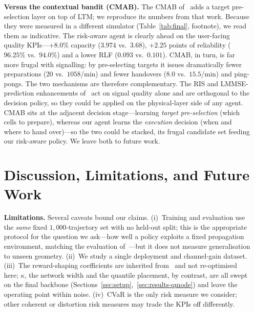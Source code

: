 \documentclass[conference]{IEEEtran}
\begin{document}
\textbf{Versus the contextual bandit (CMAB).} The CMAB of~\cite{cmab_ho} adds a
target pre-selection layer on top of LTM; we reproduce its numbers from that
work. Because they were measured in a different simulator
(Table~\ref{tab:final}, footnote), we read them as indicative. The risk-aware
agent is clearly ahead on the user-facing quality KPIs---$+8.0\%$ capacity
($3.974$ vs.\ $3.68$), $+2.25$ points of reliability ($96.25\%$ vs.\ $94.0\%$)
and a lower RLF ($0.093$ vs.\ $0.101$). CMAB, in turn, is far more frugal with
signalling: by pre-selecting targets it issues dramatically fewer preparations
($20$ vs.\ $1058$/min) and fewer handovers ($8.0$ vs.\ $15.5$/min) and
ping-pongs. The two mechanisms are therefore complementary. The RIS and LMMSE-prediction
enhancements of~\cite{cmab_ho} act on signal quality alone and are orthogonal
to the decision policy, so they could be applied on the physical-layer side of
any agent. CMAB sits at the adjacent decision stage---learning \emph{target
pre-selection} (which cells to prepare), whereas our agent learns the
\emph{execution} decision (when and where to hand over)---so the two could be
stacked, its frugal candidate set feeding our risk-aware policy. We leave both
to future work.

\section{Discussion, Limitations, and Future Work}
\label{sec:discussion}
\textbf{Limitations.} Several caveats bound our claims. (i)~Training and
evaluation use the \emph{same} fixed $1{,}000$-trajectory set with no held-out
split; this is the appropriate protocol for the question we ask---how well a
policy exploits a fixed propagation environment, matching the evaluation
of~\cite{cmab_ho}---but it does not measure generalisation to unseen geometry.
(ii)~We study a single deployment and channel-gain dataset. (iii)~The
reward-shaping coefficients are inherited from~\cite{cmab_ho} and not re-optimised
here; $\kappa$, the network width and the quantile placement, by contrast, are
all swept on the final backbone (Sections~\ref{sec:setup},~\ref{sec:results-qmode})
and leave the operating point within noise. (iv)~CVaR is the only risk measure we
consider; other coherent or distortion risk measures may trade the KPIs off
differently.
\end{document}
